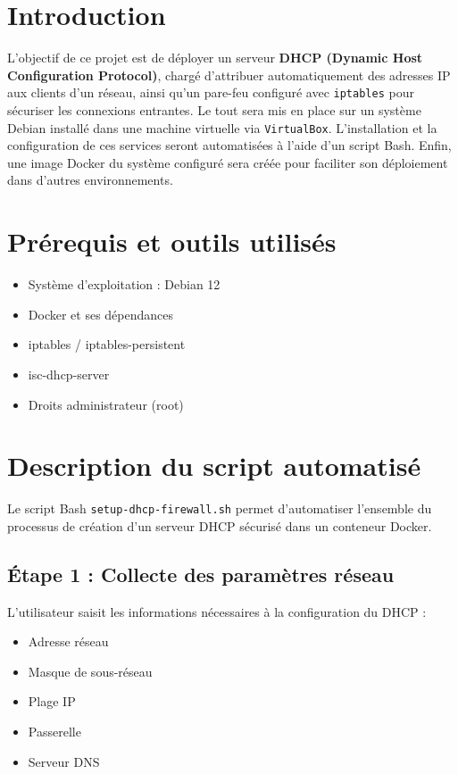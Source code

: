 		
	\section{Introduction}
	L’objectif de ce projet est de déployer un serveur \textbf{DHCP (Dynamic Host Configuration Protocol)}, chargé d’attribuer automatiquement des adresses IP aux clients d’un réseau, ainsi qu’un pare-feu configuré avec \texttt{iptables} pour sécuriser les connexions entrantes. Le tout sera mis en place sur un système Debian installé dans une machine virtuelle via \texttt{VirtualBox}. L’installation et la configuration de ces services seront automatisées à l’aide d’un script Bash. Enfin, une image Docker du système configuré sera créée pour faciliter son déploiement dans d’autres environnements.
	
	\section{Prérequis et outils utilisés}
	\begin{itemize}
		\item Système d’exploitation : Debian 12
		\item Docker et ses dépendances
		\item iptables / iptables-persistent
		\item isc-dhcp-server
		\item Droits administrateur (root)
	\end{itemize}
	
	\section{Description du script automatisé}
	
	Le script Bash \texttt{setup-dhcp-firewall.sh} permet d’automatiser l’ensemble du processus de création d’un serveur DHCP sécurisé dans un conteneur Docker.
	
	\subsection*{Étape 1 : Collecte des paramètres réseau}
	L'utilisateur saisit les informations nécessaires à la configuration du DHCP :
	\begin{itemize}
		\item Adresse réseau
		\item Masque de sous-réseau
		\item Plage IP
		\item Passerelle
		\item Serveur DNS
	\end{itemize}
	
